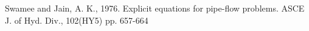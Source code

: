 \documentclass[12pt]{article}
\begin{document}
\begin{enumerate}
%

\end{enumerate}
\clearpage
\begin{thebibliography}{}

Swamee and Jain, A. K., 1976. Explicit equations for pipe-flow problems.  ASCE J. of Hyd. Div., 102(HY5) pp. 657-664 


\end{thebibliography}







\end{document}
